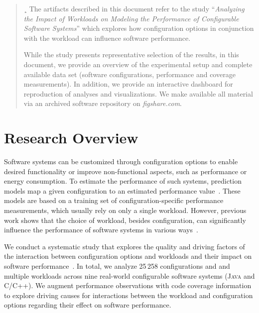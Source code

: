 \documentclass[10pt,conference]{IEEEtran}
\begin{document}
	\maketitle
	\setcounter{tocdepth}{4}
	
	\begin{abstract}¸
	The artifacts described in this document refer to the study ``\textit{Analyzing the Impact of Workloads on Modeling the Performance of Configurable Software Systems}'' which explores how configuration options in conjunction with the workload can influence software performance.
	
	While the study presents representative selection of the results, in this document, we provide an overview of the experimental setup and complete available data set (software configurations, performance and coverage measurements). In addition, we provide an interactive dashboard for reproduction of analyses and visualizations. We make available all material via an archived software repository on \textit{figshare.com}.
	\end{abstract}

	\section{Research Overview}
	Software systems can be customized through configuration options to enable desired functionality or improve non-functional aspects, such as performance or energy consumption. To estimate the performance of such systems, prediction models map a given configuration to an estimated performance value~\cite{kaltenecker_interplay_2020}. These models are based on a training set of configuration-specific performance measurements, which usually rely on only a single workload. However, previous work shows that the choice of workload, besides configuration, can significantly influence the performance of software systems in various ways~\cite{alves_sampling_2020,lesoil_2021}.  
	
	We conduct a systematic study that explores the quality and driving factors of the interaction between configuration options and workloads and their impact on software performance~\cite{muhlbauer_workload_2023}. In total, we analyze 25\,258 configurations and and multiple workloads across nine real-world configurable software systems (\textsc{Java} and \textsc{C}/\textsc{C++}). We augment performance observations with code coverage information to explore driving causes for interactions between the workload and configuration options regarding their effect on software performance. 
	
\end{document}
